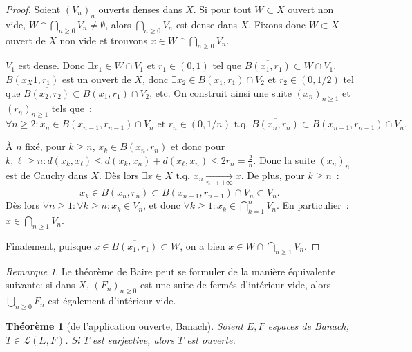 \documentclass{report}
\newcommand{\tq}{\text{ t.q. }}
\newcommand{\st}{\tq}
\newcommand{\pinfty}{{+\infty}}
\newtheorem{thm}{Théorème}[chapter]
\theoremstyle{definition}
\theoremstyle{remark}
\newtheorem*{rmq}{Remarque}
\begin{document}
\begin{proof} Soient $(V_n)_n$ ouverts denses dans $X$. Si pour tout $W \subset X$ ouvert non vide, $W \cap \bigcap_{n \geq 0}V_n \neq \emptyset$, alors $\bigcap_{n \geq 0}V_n$
est dense dans $X$. Fixons donc $W \subset X$ ouvert de $X$ non vide et trouvons $x \in W \cap \bigcap_{n \geq 0}V_n$.

$V_1$ est dense. Donc $\exists x_1 \in W \cap V_1$ et $r_1 \in (0, 1)$ tel que $\overline {B(x_1, r_1)} \subset W \cap V_1$. $B(x_X1, r_1)$ est un ouvert de $X$, donc
$\exists x_2 \in B(x_1, r_1) \cap V_2$ et $r_2 \in (0, 1/2)$ tel que $\overline {B(x_2, r_2)} \subset B(x_1, r_1) \cap V_2$, etc. On construit ainsi une suite $(x_n)_{n \geq 1}$
et $(r_n)_{n \geq 1}$ tels que~:
\[\forall n \geq 2 : x_n \in B(x_{n-1}, r_{n-1}) \cap V_n \text{ et } r_n \in (0, 1/n) \st \overline {B(x_n, r_n)} \subset B(x_{n-1}, r_{n-1}) \cap V_n.\]

À $n$ fixé, pour $k \geq n$, $x_k \in B(x_n, r_n)$ et donc pour $k, \ell \geq n : d(x_k, x_\ell) \leq d(x_k, x_n) + d(x_\ell, x_n) \leq 2r_n = \frac 2n$.
Donc la suite $(x_n)_n$ est de Cauchy dans $X$. Dès lors $\exists x \in X \st x_n \xrightarrow[n \to \pinfty]{} x$. De plus, pour $k \geq n$~:
\[x_k \in \overline {B(x_n, r_n)} \subset B(x_{n-1}, r_{n-1}) \cap V_n \subset V_n.\]
Dès lors $\forall n \geq 1 : \forall k \geq n : x_k \in V_n$, et donc $\forall k \geq 1 : x_k \in \bigcap_{k=1}^nV_n$. En particulier~: $x \in \bigcap_{n \geq 1}V_n$.

Finalement, puisque $x \in \overline {B(x_1, r_1)} \subset W$, on a bien $x \in W \cap \bigcap_{n \geq 1}V_n$.
\end{proof}

\begin{rmq} Le théorème de Baire peut se formuler de la manière équivalente suivante: si dans $X$, $(F_n)_{n \geq 0}$ est une suite de fermés d'intérieur vide,
alors $\bigcup_{n \geq 0}F_n$ est également d'intérieur vide.
\end{rmq}

\begin{thm}[de l'application ouverte, Banach] Soient $E, F$ espaces de Banach, $T \in \mathcal L(E, F)$. Si $T$ est surjective, alors $T$ est ouverte.
\end{thm}
\end{document}
